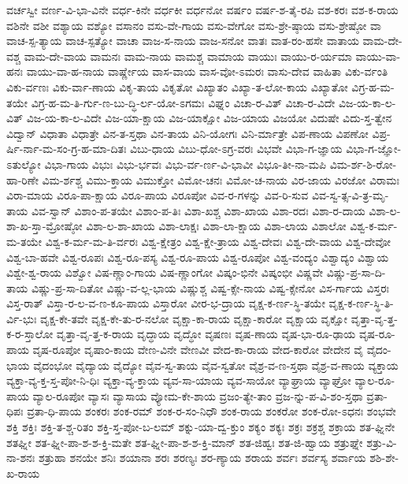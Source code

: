 {ವರ್ಚಸ್ವೀ
ವರ್ಣ-ವಿ-ಭಾ-ವಿನೇ
ವರ್ಧ-ಕಿನೇ
ವರ್ಧಕೀ
ವರ್ಧನೋ
ವರ್ಷಂ
ವರ್ಷ-ಶ-ತೈ-ರಪಿ
ವಶ-ಕರಃ
ವಶ-ಕ-ರಾಯ
ವಶಿನೇ
ವಶೀ
ವಶ್ಯಾಯ
ವಶ್ಯೋ
ವಸಾನಂ
ವಸು-ವೇ-ಗಾಯ
ವಸು-ವೇಗೋ
ವಸು-ಶ್ರೇ-ಷ್ಠಾಯ
ವಸು-ಶ್ರೇಷ್ಠೋ
ವಾ
ವಾಚ-ಸ್ಪ-ತ್ಯಾಯ
ವಾಚ-ಸ್ಪತ್ಯೋ
ವಾಚಾ
ವಾಜ-ಸ-ನಾಯ
ವಾಜ-ಸನೋ
ವಾತಃ
ವಾತ-ರಂ-ಹಸೇ
ವಾತಾಯ
ವಾಮ-ದೇ-ವಶ್ಚ
ವಾಮ-ದೇ-ವಾಯ
ವಾಮನಃ
ವಾಮ-ನಾಯ
ವಾಮಶ್ಚ
ವಾಮಾಯ
ವಾಯುಃ
ವಾಯು-ರ-ರ್ಯಮಾ
ವಾಯು-ವಾ-ಹನಃ
ವಾಯು-ವಾ-ಹ-ನಾಯ
ವಾರ್ಷ್ಣೇಯ
ವಾಸ-ವಾಯ
ವಾಸ-ವೋ-ಽಮರಃ
ವಾಸು-ದೇವ
ವಾಹಿತಾ
ವಿಕು-ರ್ವಂತಿ
ವಿಕು-ರ್ವಣಃ
ವಿಕು-ರ್ವಾ-ಣಾಯ
ವಿಕೃ-ತಾಯ
ವಿಕೃತೋ
ವಿಖ್ಯಾತಂ
ವಿಖ್ಯಾ-ತ-ಲೋ-ಕಾಯ
ವಿಖ್ಯಾತೋ
ವಿಗ್ರ-ಹ-ಮ-ತಯೇ
ವಿಗ್ರ-ಹ-ಮ-ತಿ-ರ್ಗು-ಣ-ಬು-ದ್ಧಿ-ರ್ಲ-ಯೋ-ಽಗಮಃ
ವಿಘ್ನಂ
ವಿಚಾ-ರ-ವಿತ್
ವಿಚಾ-ರ-ವಿದೇ
ವಿಜ-ಯ-ಕಾ-ಲ-ವಿತ್
ವಿಜ-ಯ-ಕಾ-ಲ-ವಿದೇ
ವಿಜ-ಯಾ-ಕ್ಷಾಯ
ವಿಜ-ಯಾಕ್ಷೋ
ವಿಜ-ಯಾಯ
ವಿಜಯೋ
ವಿದುಷೇ
ವಿದು-ಸ್ತ-ತ್ವೇನ
ವಿದ್ವಾನ್
ವಿಧಾತಾ
ವಿಧಾತ್ರೇ
ವಿನ-ತ-ಸ್ತಥಾ
ವಿನ-ತಾಯ
ವಿನಿ-ಯೋಗಃ
ವಿನಿ-ರ್ಮಾತ್ರೇ
ವಿಪ-ಣಾಯ
ವಿಪಣೋ
ವಿಪ್ರ-ರ್ಷಿ-ರ್ನಾ-ಮ-ಸಂ-ಗ್ರ-ಹ-ಮಾ-ದಿತಃ
ವಿಬು-ಧಾಯ
ವಿಬು-ಧೋ-ಽಗ್ರ-ವರಃ
ವಿಭವೇ
ವಿಭಾ-ಗ-ಜ್ಞಾಯ
ವಿಭಾ-ಗ-ಜ್ಞೋ-ಽತುಲ್ಯೋ
ವಿಭಾ-ಗಾಯ
ವಿಭುಃ
ವಿಭು-ರ್ಭವಃ
ವಿಭು-ರ್ವ-ರ್ಣ-ವಿ-ಭಾವೀ
ವಿಭೂ-ತೀ-ನಾ-ಮಪಿ
ವಿಮ-ರ್ಶ-ಶಿ-ರೋ-ಹಾ-ರಿಣೇ
ವಿಮ-ರ್ಶಶ್ಚ
ವಿಮು-ಕ್ತಾಯ
ವಿಮುಕ್ತೋ
ವಿಮೋ-ಚನಃ
ವಿಮೋ-ಚ-ನಾಯ
ವಿರ-ಜಾಯ
ವಿರಜೋ
ವಿರಾಮಃ
ವಿರಾ-ಮಾಯ
ವಿರೂ-ಪಾ-ಕ್ಷಾಯ
ವಿರೂ-ಪಾಯ
ವಿರೂಪೋ
ವಿವ-ರ-ಗಳನ್ನು
ವಿವ-ರಿ-ಸುವ
ವಿವ-ಸ್ವ-ತ್ಸ-ವಿ-ತ್ರ-ಮೃ-ತಾಯ
ವಿವ-ಸ್ವಾನ್
ವಿಶಾಂ-ಪ-ತಯೇ
ವಿಶಾಂ-ಪ-ತಿಃ
ವಿಶಾ-ಖಶ್ಚ
ವಿಶಾ-ಖಾಯ
ವಿಶಾ-ರದಃ
ವಿಶಾ-ರ-ದಾಯ
ವಿಶಾ-ಲ-ಶಾ-ಖ-ಸ್ತಾ-ಮ್ರೋಷ್ಠೋ
ವಿಶಾ-ಲ-ಶಾ-ಖಾಯ
ವಿಶಾ-ಲಾಕ್ಷಃ
ವಿಶಾ-ಲಾ-ಕ್ಷಾಯ
ವಿಶಾ-ಲಾಯ
ವಿಶಾಲೋ
ವಿಶ್ವ-ಕ-ರ್ಮ-ಮ-ತಯೇ
ವಿಶ್ವ-ಕ-ರ್ಮ-ಮ-ತಿ-ರ್ವರಃ
ವಿಶ್ವ-ಕ್ಷೇತ್ರಂ
ವಿಶ್ವ-ಕ್ಷೇ-ತ್ರಾಯ
ವಿಶ್ವ-ದೇವಃ
ವಿಶ್ವ-ದೇ-ವಾಯ
ವಿಶ್ವ-ದೇವೋ
ವಿಶ್ವ-ಬಾ-ಹವೇ
ವಿಶ್ವ-ರೂಪಃ
ವಿಶ್ವ-ರೂ-ಪಸ್ಯ
ವಿಶ್ವ-ರೂ-ಪಾಯ
ವಿಶ್ವ-ರೂಪೋ
ವಿಶ್ವ-ವಂದ್ಯಂ
ವಿಶ್ವಾದ್ಯಂ
ವಿಶ್ವಾಯ
ವಿಶ್ವೇ-ಶ್ವ-ರಾಯ
ವಿಶ್ವೋ
ವಿಷ-ಣ್ಣಾಂ-ಗಾಯ
ವಿಷ-ಣ್ಣಾಂಗೋ
ವಿಷ್ಕಂ-ಭಿನೇ
ವಿಷ್ಕಂಭೀ
ವಿಷ್ಣವೇ
ವಿಷ್ಣು-ಪ್ರ-ಸಾ-ದಿ-ತಾಯ
ವಿಷ್ಣು-ಪ್ರ-ಸಾ-ದಿತೋ
ವಿಷ್ಣು-ವ-ಲ್ಲ-ಭಾಯ
ವಿಷ್ಣುಶ್ಚ
ವಿಷ್ವ-ಕ್ಸೇ-ನಾಯ
ವಿಷ್ವ-ಕ್ಸೇನೋ
ವಿಸ-ರ್ಗಾಯ
ವಿಸ್ತರಃ
ವಿಸ್ತ-ರಾತ್
ವಿಸ್ತಾ-ರ-ಲ-ವ-ಣ-ಕೂ-ಪಾಯ
ವಿಸ್ತಾರೋ
ವೀರ-ಭ-ದ್ರಾಯ
ವೃಕ್ಷ-ಕ-ರ್ಣ-ಸ್ಥಿ-ತಯೇ
ವೃಕ್ಷ-ಕ-ರ್ಣ-ಸ್ಥಿ-ತಿ-ರ್ವಿ-ಭುಃ
ವೃಕ್ಷ-ಕೇ-ತವೇ
ವೃಕ್ಷ-ಕೇ-ತು-ರ-ನಲೋ
ವೃಕ್ಷಾ-ಕಾ-ರಾಯ
ವೃಕ್ಷಾ-ಕಾರೋ
ವೃಕ್ಷಾಯ
ವೃಕ್ಷೋ
ವೃತ್ತಾ-ವೃ-ತ್ತ-ಕ-ರ-ಸ್ತಾಲೋ
ವೃತ್ತಾ-ವೃ-ತ್ತ-ಕ-ರಾಯ
ವೃದ್ಧಾಯ
ವೃದ್ಧೋ
ವೃಷಣಃ
ವೃಷ-ಣಾಯ
ವೃಷ-ಭಾ-ರೂ-ಢಾಯ
ವೃಷ-ರೂ-ಪಾಯ
ವೃಷ-ರೂಪೋ
ವೃಷಾಂ-ಕಾಯ
ವೇಣ-ವಿನೇ
ವೇಣವೀ
ವೇದ-ಕಾ-ರಾಯ
ವೇದ-ಕಾರೋ
ವೇದೇನ
ವೈ
ವೈದಂ-ಭಾಯ
ವೈದಂಭೋ
ವೈದ್ಯಾಯ
ವೈದ್ಯೋ
ವೈವ-ಸ್ವ-ತಾಯ
ವೈವ-ಸ್ವತೋ
ವೈಶ್ರ-ವ-ಣ-ಸ್ತಥಾ
ವೈಶ್ರ-ವ-ಣಾಯ
ವ್ಯಕ್ತಾಯ
ವ್ಯಕ್ತಾ-ವ್ಯ-ಕ್ತ-ಸ್ತ-ಪೋ-ನಿ-ಧಿಃ
ವ್ಯಕ್ತಾ-ವ್ಯ-ಕ್ತಾಯ
ವ್ಯವ-ಸಾ-ಯಾಯ
ವ್ಯವ-ಸಾಯೋ
ವ್ಯಾಘ್ರಾಯ
ವ್ಯಾಘ್ರೋ
ವ್ಯಾಲ-ರೂ-ಪಾಯ
ವ್ಯಾಲ-ರೂಪೋ
ವ್ಯಾಸಃ
ವ್ಯಾಸಾಯ
ವ್ಯೋಮ-ಕೇ-ಶಾಯ
ವ್ರಜಂ-ತ್ಯೇ-ತಾಂ
ವ್ರಜ-ನ್ನು-ಪ-ವಿ-ಶಂ-ಸ್ತಥಾ
ವ್ರತಾ-ಧಿಪಃ
ವ್ರತಾ-ಧಿ-ಪಾಯ
ಶಂಕರಃ
ಶಂಕ-ರಮ್
ಶಂಕ-ರ-ಸಂ-ನಿಧೌ
ಶಂಕ-ರಾಯ
ಶಂಕರೋ
ಶಂಕ-ರೋ-ಽಧನಃ
ಶಂಭವೇ
ಶಕ್ತಿ
ಶಕ್ತಿಃ
ಶಕ್ತಿ-ತ-ಶ್ಚ-ರಿತಂ
ಶಕ್ತಿ-ಸ್ತ-ಪೋ-ಬ-ಲಮ್
ಶಕ್ನು-ಯಾ-ದ್ವ-ಕ್ತುಂ
ಶಕ್ಯಂ
ಶಕ್ಯಃ
ಶಕ್ರಃ
ಶಕ್ರಶ್ಚ
ಶಕ್ರಾಯ
ಶತ-ಘ್ನಿನೇ
ಶತಘ್ನೀ
ಶತ-ಘ್ನೀ-ಪಾ-ಶ-ಶ-ಕ್ತಿ-ಮತೇ
ಶತ-ಘ್ನೀ-ಪಾ-ಶ-ಶ-ಕ್ತಿ-ಮಾನ್
ಶತ-ಜಿಹ್ವಃ
ಶತ-ಜಿ-ಹ್ವಾಯ
ಶತ್ರುಘ್ನೇ
ಶತ್ರು-ವಿ-ನಾ-ಶನಃ
ಶತ್ರುಹಾ
ಶನಯೇ
ಶನಿಃ
ಶಯಾನಾ
ಶರಃ
ಶರಣ್ಯಃ
ಶರ-ಣ್ಯಾಯ
ಶರಾಯ
ಶರ್ವಃ
ಶರ್ವಸ್ಯ
ಶರ್ವಾಯ
ಶಶಿ-ಶೇ-ಖ-ರಾಯ
}
